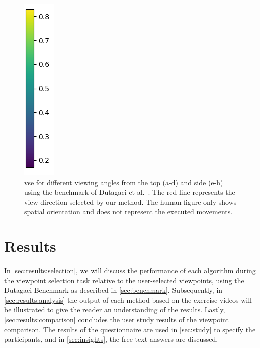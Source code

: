 \begin{figure}[ht]
	    \includegraphics[width=0.041\linewidth]{pictures/scale.png}
	\caption[Comparison of our method to user selected view points.]{\acrfull{vse} for different viewing angles from the top (a-d) and side (e-h) using the benchmark of Dutagaci et al.~\cite{dutagaci2010bbv}. The red line represents the view direction selected by our method. The human figure only shows spatial orientation and does not represent the executed movements.}
	\label{fig:colorMaps}
\end{figure}

\section{Results\label{results}}
In \autoref{sec:results:selection}, we will discuss the performance of each algorithm during the viewpoint selection task relative to the user-selected viewpoints, using the Dutagaci Benchmark as described in \autoref{sec:benchmark}. Subsequently, in \autoref{sec:results:analysis} the output of each method based on the exercise videos will be illustrated to give the reader an understanding of the results. Lastly, \autoref{sec:results:comparison} concludes the user study results of the viewpoint comparison. The results of the questionnaire are used in \autoref{sec:study} to specify the participants, and in \autoref{sec:insights}, the free-text answers are discussed.


